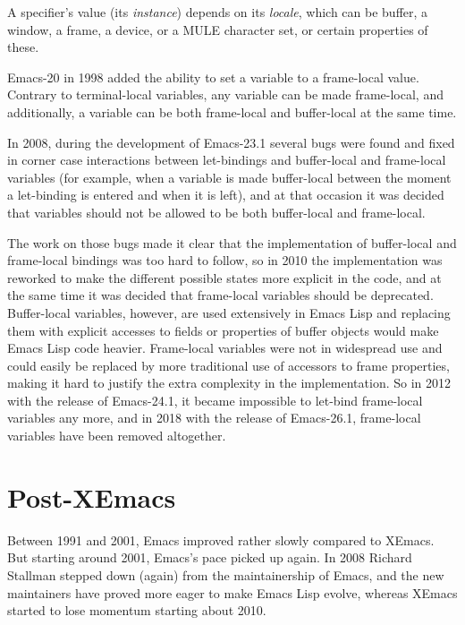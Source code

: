 \documentclass[format=acmsmall, review]{acmart}
\newcommand \Elisp {Emacs Lisp}
\begin{document}
A specifier's value (its \emph{instance}) depends on its
\emph{locale}, which can be buffer, a window, a frame, a device, or a MULE
character set, or certain properties of these.

Emacs-20 in 1998 added the ability to set a variable to a frame-local
value.  Contrary to terminal-local variables, any variable can be made
frame-local, and additionally, a variable can be both frame-local and
buffer-local at the same time.

In 2008, during the development of Emacs-23.1 several bugs were found and
fixed in corner case interactions between let-bindings and buffer-local and
frame-local variables (for example, when a variable is made buffer-local
between the moment a let-binding is entered and when it is left), and at
that occasion it was decided that variables should not be allowed to be both
buffer-local and frame-local.

The work on those bugs made it clear that the implementation of buffer-local
and frame-local bindings was too hard to follow, so in 2010 the
implementation was reworked to make the different possible states more
explicit in the code, and at the same time it was decided that frame-local
variables should be deprecated.  Buffer-local variables, however, are used
extensively in \Elisp{} and replacing them with explicit accesses to fields
or properties of buffer objects would make \Elisp{} code heavier.
Frame-local variables were not in widespread use and could easily be
replaced by more traditional use of accessors to frame properties, making it
hard to justify the extra complexity in the implementation.  So in 2012 with
the release of Emacs-24.1, it became impossible to let-bind frame-local
variables any more, and in 2018 with the release of Emacs-26.1, frame-local
variables have been removed altogether.

\section{Post-XEmacs}           %
\label{sec:post-xemacs}

Between 1991 and 2001, Emacs improved rather slowly compared to XEmacs.
But starting around 2001, Emacs's pace picked up again.  In 2008 Richard
Stallman stepped down (again) from the maintainership of Emacs, and the new
maintainers have proved more eager to make \Elisp{} evolve, whereas XEmacs
started to lose momentum starting about 2010.
\end{document}
